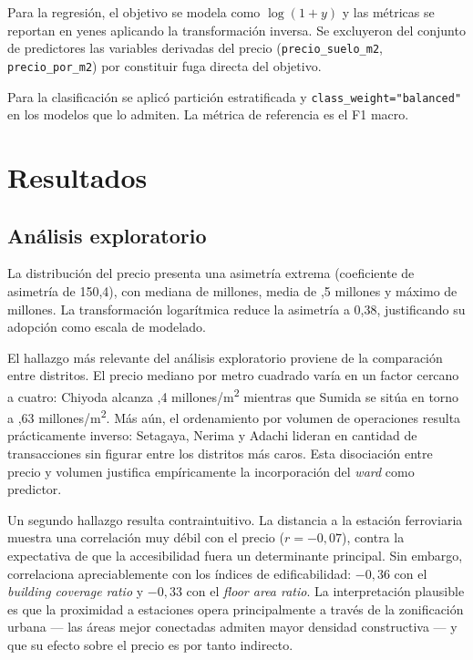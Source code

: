 \documentclass[conference]{IEEEtran}
\begin{document}
Para la regresión, el objetivo se modela como $\log(1+y)$ y las métricas se reportan en yenes
aplicando la transformación inversa. Se excluyeron del conjunto de predictores las variables
derivadas del precio (\texttt{precio\_suelo\_m2}, \texttt{precio\_por\_m2}) por constituir fuga
directa del objetivo.

Para la clasificación se aplicó partición estratificada y \texttt{class\_weight="balanced"} en
los modelos que lo admiten. La métrica de referencia es el F1 macro.

\section{Resultados}
\label{sec:eda}

\subsection{Análisis exploratorio}

La distribución del precio presenta una asimetría extrema (coeficiente de asimetría de 150,4),
con mediana de  millones, media de ,5 millones y máximo de
 millones. La transformación logarítmica reduce la asimetría a 0,38,
justificando su adopción como escala de modelado.

El hallazgo más relevante del análisis exploratorio proviene de la comparación entre distritos.
El precio mediano por metro cuadrado varía en un factor cercano a cuatro: Chiyoda alcanza
,4 millones/m\textsuperscript{2} mientras que Sumida se sitúa en torno a
,63 millones/m\textsuperscript{2}. Más aún, el ordenamiento por volumen de operaciones
resulta prácticamente inverso: Setagaya, Nerima y Adachi lideran en cantidad de transacciones
sin figurar entre los distritos más caros. Esta disociación entre precio y volumen justifica
empíricamente la incorporación del \textit{ward} como predictor.

Un segundo hallazgo resulta contraintuitivo. La distancia a la estación ferroviaria muestra una
correlación muy débil con el precio ($r = -0{,}07$), contra la expectativa de que la
accesibilidad fuera un determinante principal. Sin embargo, correlaciona apreciablemente con
los índices de edificabilidad: $-0{,}36$ con el \textit{building coverage ratio} y $-0{,}33$
con el \textit{floor area ratio}. La interpretación plausible es que la proximidad a estaciones
opera principalmente a través de la zonificación urbana --- las áreas mejor conectadas admiten
mayor densidad constructiva --- y que su efecto sobre el precio es por tanto indirecto.
\end{document}

